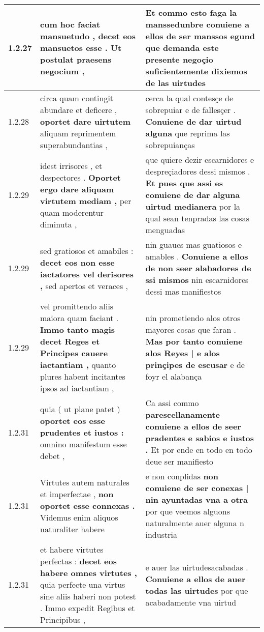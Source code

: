 \begin{tabular}{|p{1cm}|p{6.5cm}|p{6.5cm}|}
1.2.27 & cum hoc faciat mansuetudo , \textbf{ decet eos mansuetos esse . } Ut postulat praesens negocium , & Et commo esto faga la manssedunbre \textbf{ conuiene a ellos de ser manssos } egund que demanda este presente negoçio suficientemente dixiemos de las uirtudes \\\hline
1.2.28 & circa quam contingit abundare et deficere , \textbf{ oportet dare uirtutem } aliquam reprimentem superabundantias , & cerca la qual contesçe de sobrepuiar e de fallesçer . \textbf{ Conuiene de dar uirtud alguna } que reprima las sobrepuianças \\\hline
1.2.29 & idest irrisores , et despectores . \textbf{ Oportet ergo dare aliquam virtutem mediam , } per quam moderentur diminuta , & que quiere dezir escarnidores e despreçiadores dessi mismos . \textbf{ Et pues que assi es conuiene de dar alguna uirtud medianera } por la qual sean tenpradas las cosas menguadas \\\hline
1.2.29 & sed gratiosos et amabiles : \textbf{ decet eos non esse iactatores vel derisores , } sed apertos et veraces , & nin guaues mas guatiosos e amables . \textbf{ Conuiene a ellos de non seer alabadores de ssi mismos } nin escarnidores dessi mas manifiestos \\\hline
1.2.29 & vel promittendo aliis maiora quam faciant . \textbf{ Immo tanto magis decet Reges et Principes cauere iactantiam , } quanto plures habent incitantes ipsos ad iactantiam , & nin prometiendo alos otros mayores cosas que faran . \textbf{ Mas por tanto conuiene alos Reyes | e alos prinçipes de escusar } e de foyr el alabança \\\hline
1.2.31 & quia ( ut plane patet ) \textbf{ oportet eos esse prudentes et iustos : } omnino manifestum esse debet , & Ca assi commo \textbf{ parescellanamente conuiene a ellos de seer pradentes e sabios e iustos . } Et por ende en todo en todo deue ser manifiesto \\\hline
1.2.31 & Virtutes autem naturales et imperfectae , \textbf{ non oportet esse connexas . } Videmus enim aliquos naturaliter habere & e non conplidas \textbf{ non conuiene de ser conexas | nin ayuntadas vna a otra } por que veemos alguons naturalmente auer alguna n industria \\\hline
1.2.31 & et habere virtutes perfectas : \textbf{ decet eos habere omnes virtutes , } quia perfecte una virtus sine aliis haberi non potest . Immo expedit Regibus et Principibus , & e auer las uirtudesacabadas . \textbf{ Conuiene a ellos de auer todas las uirtudes } por que acabadamente vna uirtud \\\hline

\end{tabular}
